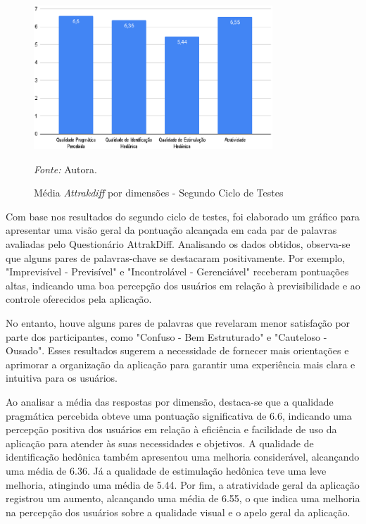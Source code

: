 \begin{figure}[h!]
	\centering
	\caption{Média \textit{Attrakdiff} por dimensões - Segundo Ciclo de Testes}
	\begin{adjustbox}{center}
		\includegraphics[width=0.8\textwidth]{figuras/media-separada1.eps}
	\end{adjustbox}
	\begin{tablenotes}[flushleft]
		\centering
		\item \textit{Fonte:} Autora.
	\end{tablenotes}
	\label{fig29}
\end{figure}

Com base nos resultados do segundo ciclo de testes, foi elaborado um gráfico para apresentar uma visão geral da pontuação alcançada em cada par de palavras avaliadas pelo Questionário AttrakDiff. Analisando os dados obtidos, observa-se que alguns pares de palavras-chave 
se destacaram positivamente. Por exemplo, "Imprevisível - Previsível" e "Incontrolável - Gerenciável" receberam pontuações altas, indicando uma boa percepção dos usuários em relação à previsibilidade e ao controle oferecidos pela aplicação.

No entanto, houve alguns pares de palavras que revelaram menor satisfação por parte dos participantes, como "Confuso - Bem Estruturado" e "Cauteloso - Ousado". Esses resultados sugerem a necessidade de fornecer mais orientações e aprimorar a organização da aplicação 
para garantir uma experiência mais clara e intuitiva para os usuários.

Ao analisar a média das respostas por dimensão, destaca-se que a qualidade pragmática percebida obteve uma pontuação significativa de 6.6, indicando uma percepção positiva dos usuários em relação à eficiência e facilidade de uso da aplicação para atender às suas necessidades 
e objetivos. A qualidade de identificação hedônica também apresentou uma melhoria considerável, alcançando uma média de 6.36. Já a qualidade de estimulação hedônica teve uma leve melhoria, atingindo uma média de 5.44. Por fim, a atratividade geral da aplicação registrou um aumento, 
alcançando uma média de 6.55, o que indica uma melhoria na percepção dos usuários sobre a qualidade visual e o apelo geral da aplicação.

